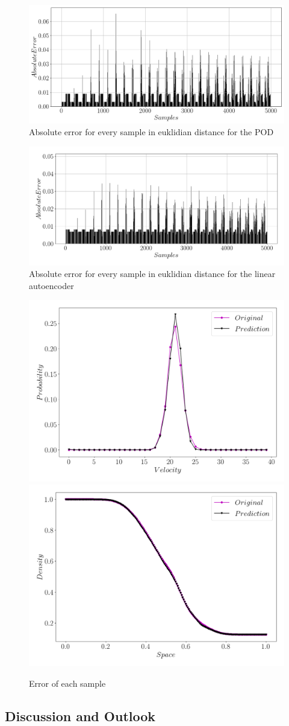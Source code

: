 \documentclass[12pt, a4paper]{article}
\begin{document}
\begin{figure}[htb!]
	\centering
	\includegraphics[width=\textwidth]{Figures/Error_samples_SVD.png}
	\caption{Absolute error for every sample in euklidian distance for the POD}
	\label{Fig:Error_samples_svd}
\end{figure}
\begin{figure}[htb!]
	\centering
	\includegraphics[width=\textwidth]{Figures/Error_samples_v1_1.png}
	\caption{Absolute error for every sample in euklidian distance for the linear autoencoder}
	\label{Fig:error_sample}
\end{figure} 
\begin{figure}[htb!]
	\centering
	\includegraphics[width=.49\textwidth]{Figures/Sample500_v1_1.png}
	\includegraphics[width=.49\textwidth]{Figures/Density_last_v1_1.png}
	\caption{Error of each sample}
	\label{Fig:Errormore}
\end{figure}
\subsection{Discussion and Outlook}
{}

\end{document}
